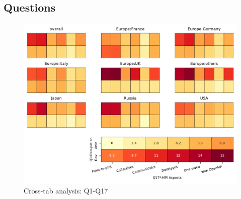 
\subsection{Questions}


\begin{figure}
\begin{center}
\includegraphics[width=12cm]{../pdfs/Q1-Q17.pdf}
\caption{Cross-tab analysis: Q1-Q17}
\label{fig:Q1-Q17}
\end{center}
\end{figure}
